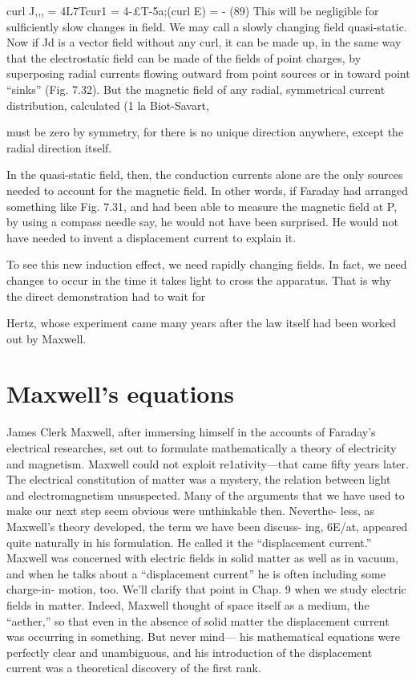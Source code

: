 \begin{equation}
\end{equation}
curl J,,, = 4L7Tcur1  = 4-£T-5a;(curl E) = -  (89)
This will be negligible for sulficiently slow changes in field. We
may call a slowly changing field quasi-static. Now if Jd is a vector
field without any curl, it can be made up, in the same way that the
electrostatic field can be made of the fields of point charges, by superposing
radial currents flowing outward from point sources or in
toward point ``sinks'' (Fig. 7.32). But the magnetic field of any
radial, symmetrical current distribution, calculated (1 la Biot-Savart,

must be zero by symmetry, for there is no unique direction anywhere,
except the radial direction itself.

In the quasi-static field, then, the conduction currents alone are
the only sources needed to account for the magnetic field. In other
words, if Faraday had arranged something like Fig. 7.31, and had
been able to measure the magnetic field at P, by using a compass
needle say, he would not have been surprised. He would not have
needed to invent a displacement current to explain it.

To see this new induction effect, we need rapidly changing fields.
In fact, we need changes to occur in the time it takes light to cross
the apparatus. That is why the direct demonstration had to wait for

Hertz, whose experiment came many years after the law itself had
been worked out by Maxwell.

\section{Maxwell's equations}

James Clerk Maxwell, after immersing himself in the accounts of
Faraday's electrical researches, set out to formulate mathematically
a theory of electricity and magnetism. Maxwell could not exploit
re1ativity---that came fifty years later. The electrical constitution
of matter was a mystery, the relation between light and electromagnetism
unsuspected. Many of the arguments that we have used to
make our next step seem obvious were unthinkable then. Neverthe-
less, as Maxwell's theory developed, the term we have been discuss-
ing, 6E/at, appeared quite naturally in his formulation. He called
it the ``displacement current.'' Maxwell was concerned with electric
fields in solid matter as well as in vacuum, and when he talks about
a ``displacement current'' he is often including some charge-in-
motion, too. We'll clarify that point in Chap. 9 when we study electric
fields in matter. Indeed, Maxwell thought of space itself as a
medium, the ``aether,'' so that even in the absence of solid matter the
displacement current was occurring in something. But never mind---
his mathematical equations were perfectly clear and unambiguous,
and his introduction of the displacement current was a theoretical
discovery of the first rank. 

